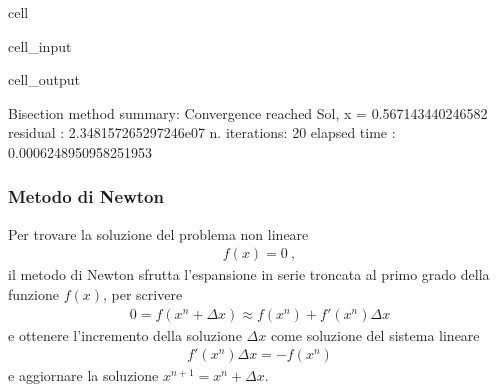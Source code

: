 \documentclass[letterpaper,10pt,english]{jupyterBook}
\begin{document}
\begin{sphinxuseclass}{cell}
\begin{sphinxVerbatimInput}
\begin{sphinxuseclass}{cell_input}
\end{sphinxuseclass}\end{sphinxVerbatimInput}
\begin{sphinxVerbatimOutput}

\begin{sphinxuseclass}{cell_output}
\begin{sphinxVerbatim}[commandchars=\\\{\}]
Bisection method summary: 
Convergence reached
Sol, x = \PYGZhy{}0.567143440246582
residual     : \PYGZhy{}2.348157265297246e\PYGZhy{}07
n. iterations: 20
elapsed time : 0.0006248950958251953
\end{sphinxVerbatim}

\end{sphinxuseclass}\end{sphinxVerbatimOutput}

\end{sphinxuseclass}

\subsubsection{Metodo di Newton}
\label{\detokenize{ch/numerics/nonlinear:metodo-di-newton}}
\sphinxAtStartPar
Per trovare la soluzione del problema non lineare
\begin{equation*}
\begin{split}f(x) = 0 \ ,\end{split}
\end{equation*}
\sphinxAtStartPar
il metodo di Newton sfrutta l’espansione in serie troncata al primo grado della funzione \(f(x)\), per scrivere
\begin{equation*}
\begin{split}0 = f(x^n + \Delta x) \approx f(x^n) + f'(x^n) \Delta x \end{split}
\end{equation*}
\sphinxAtStartPar
e ottenere l’incremento della soluzione \(\Delta x\) come soluzione del sistema lineare
\begin{equation*}
\begin{split}f'(x^n) \Delta x = -f(x^n)\end{split}
\end{equation*}
\sphinxAtStartPar
e aggiornare la soluzione \(x^{n+1} = x^{n} + \Delta x\).
\end{document}
